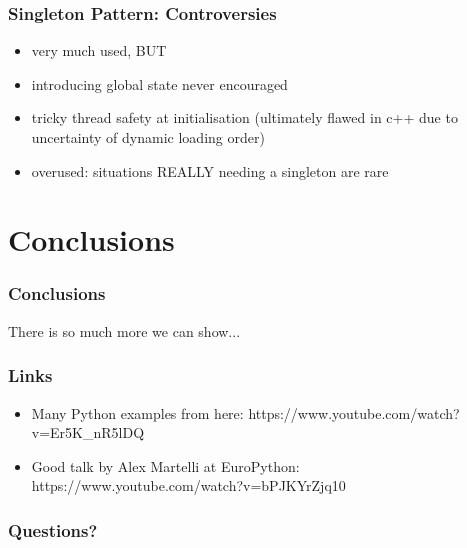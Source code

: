 \documentclass{beamer}
\begin{document}
\begin{frame}
\frametitle{Singleton Pattern: Controversies}
\begin{itemize}
 \item very much used, BUT
 \item introducing global state never encouraged
 \item tricky thread safety at initialisation (ultimately flawed in c++ due to uncertainty of dynamic loading order)
 \item overused: situations REALLY needing a singleton are rare
\end{itemize}
\end{frame} 

\section{Conclusions}
\begin{frame}
\frametitle{Conclusions}


There is so much more we can show...
 
\end{frame}

\begin{frame}
\frametitle{Links}

  \begin{itemize}
   \item Many Python examples from here: https://www.youtube.com/watch?v=Er5K\_nR5lDQ
   \item Good talk by Alex Martelli at EuroPython: https://www.youtube.com/watch?v=bPJKYrZjq10
  \end{itemize}

\end{frame}

 \begin{frame}
 \frametitle{Questions?}
 \begin{center}
 \end{center}
 \end{frame}
\end{document}
